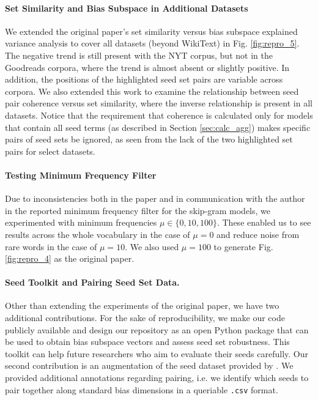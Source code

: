 \paragraph{Set Similarity and Bias Subspace in Additional Datasets} We extended the original paper's
set similarity versus bias subspace explained variance analysis to cover all datasets (beyond
WikiText) in Fig. \ref{fig:repro_5}. The negative trend is still present with the NYT corpus, but
not in the Goodreads corpora, where the trend is almost absent or slightly positive. In addition,
the positions of the highlighted seed set pairs are variable across corpora. We also extended this
work to examine the relationship between seed pair coherence versus set similarity, where the
inverse relationship is present in all datasets. Notice that the requirement that coherence is
calculated only for models that contain all seed terms (as described in Section \ref{sec:calc_agg})
makes specific pairs of seed sets be ignored, as seen from the lack of the two highlighted set pairs
for select datasets.

\paragraph{Testing Minimum Frequency Filter} Due to inconsistencies both in the paper and in
communication with the author in the reported minimum frequency filter for the skip-gram models, we
experimented with minimum frequencies $\mu \in \{ 0, 10, 100\}$. These enabled us to see results
across the whole vocabulary in the case of $\mu = 0$ and reduce noise from rare words in the case of
$\mu = 10$. We also used $\mu = 100$ to generate Fig. \ref{fig:repro_4} as the original paper.

\paragraph{Seed Toolkit and Pairing Seed Set Data.} Other than extending the experiments of the
original paper, we have two additional contributions. For the sake of reproducibility, we make our
code publicly available and design our repository as an open Python package that can be used to
obtain bias subspace vectors and assess seed set robustness. This toolkit can help future
researchers who aim to evaluate their seeds carefully. Our second contribution is an augmentation of
the seed dataset provided by \citet{antoniak-mimno-2021-bad}. We provided additional annotations
regarding pairing, i.e. we identify which seeds to pair together along standard bias dimensions in
a queriable \texttt{.csv} format.


